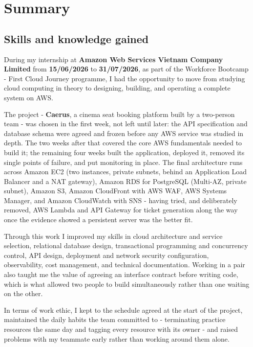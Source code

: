 \documentclass[a4paper,12pt]{article}
\begin{document}




\newpage
\section{Summary}

\subsection{Skills and knowledge gained}

During my internship at \textbf{Amazon Web Services Vietnam Company Limited} from \textbf{15/06/2026} to \textbf{31/07/2026}, as part of the Workforce Bootcamp - First Cloud Journey programme, I had the opportunity to move from studying cloud computing in theory to designing, building, and operating a complete system on AWS.

The project - \textbf{Caerus}, a cinema seat booking platform built by a two-person team - was chosen in the first week, not left until later: the API specification and database schema were agreed and frozen before any AWS service was studied in depth. The two weeks after that covered the core AWS fundamentals needed to build it; the remaining four weeks built the application, deployed it, removed its single points of failure, and put monitoring in place. The final architecture runs across Amazon EC2 (two instances, private subnets, behind an Application Load Balancer and a NAT gateway), Amazon RDS for PostgreSQL (Multi-AZ, private subnet), Amazon S3, Amazon CloudFront with AWS WAF, AWS Systems Manager, and Amazon CloudWatch with SNS - having tried, and deliberately removed, AWS Lambda and API Gateway for ticket generation along the way once the evidence showed a persistent server was the better fit.

Through this work I improved my skills in cloud architecture and service selection, relational database design, transactional programming and concurrency control, API design, deployment and network security configuration, observability, cost management, and technical documentation. Working in a pair also taught me the value of agreeing an interface contract before writing code, which is what allowed two people to build simultaneously rather than one waiting on the other.

In terms of work ethic, I kept to the schedule agreed at the start of the project, maintained the daily habits the team committed to - terminating practice resources the same day and tagging every resource with its owner - and raised problems with my teammate early rather than working around them alone.
\end{document}
